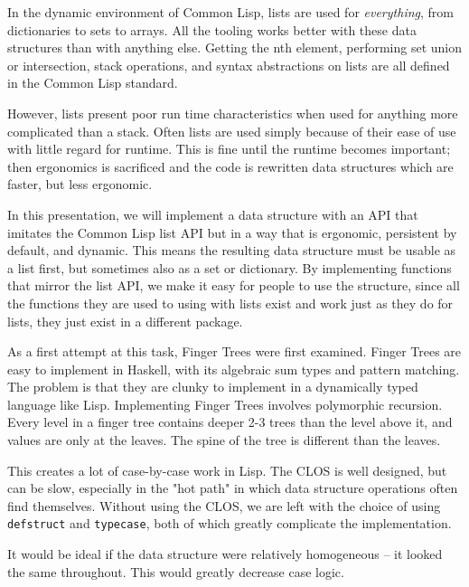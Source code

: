 \documentclass[sigconf]{acmart}
\begin{document}
In the dynamic environment of Common Lisp, lists are used for
\emph{everything}, from dictionaries to sets to arrays. All the tooling works
better with these data structures than with anything else. Getting the nth
element, performing set union or intersection, stack operations, and syntax
abstractions on lists are all defined in the Common Lisp standard.

However, lists present poor run time characteristics when used for anything more
complicated than a stack. Often lists are used simply because of their ease of
use with little regard for runtime. This is fine until the runtime becomes
important; then ergonomics is sacrificed and the code is rewritten data
structures which are faster, but less ergonomic.

In this presentation, we will implement a data structure with an API that imitates
the Common Lisp list API but in a way that is ergonomic, persistent by default,
and dynamic. This means the resulting data structure must be usable as a list
first, but sometimes also as a set or dictionary. By implementing functions
that mirror the list API, we make it easy for people to use the structure, since
all the functions they are used to using with lists exist and work just as they
do for lists, they just exist in a different package.

As a first attempt at this task, Finger Trees \cite{Hinze-Paterson:FingerTree}
were first examined. Finger Trees are easy
to implement in Haskell, with its algebraic sum types and pattern matching. The
problem is that they are clunky to implement in a dynamically typed language
like Lisp. Implementing Finger Trees involves polymorphic recursion. Every level
in a finger tree contains deeper 2-3 trees than the level above it, and values
are only at the leaves. The spine of the tree is different than the leaves.

This creates a lot of case-by-case work in Lisp. The CLOS is well designed, but
can be slow, especially in the "hot path" in which data structure operations
often find themselves. Without using the CLOS, we are left with the choice of
using \texttt{defstruct} and \texttt{typecase}, both of which greatly complicate
the implementation.

It would be ideal if the data structure were relatively homogeneous -- it looked
the same throughout. This would greatly decrease case logic.
\end{document}
